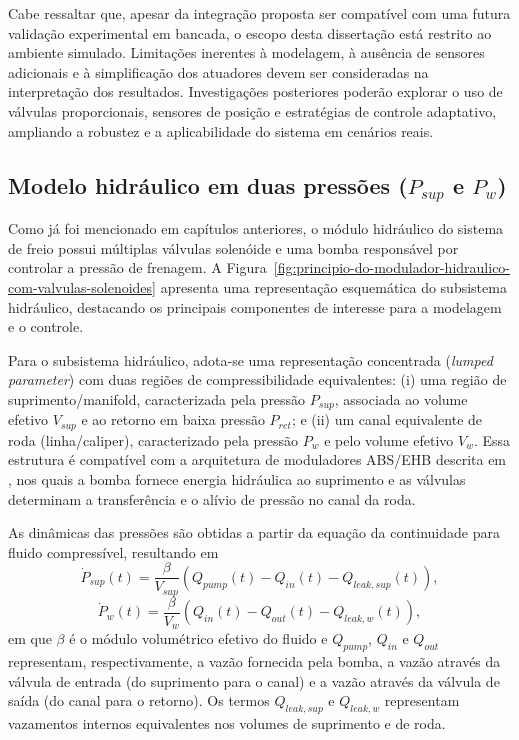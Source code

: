 Cabe ressaltar que, apesar da integração proposta ser compatível com uma futura validação experimental em bancada, o escopo desta dissertação está restrito ao ambiente simulado. Limitações inerentes à modelagem, à ausência de sensores adicionais e à simplificação dos atuadores devem ser consideradas na interpretação dos resultados. Investigações posteriores poderão explorar o uso de válvulas proporcionais, sensores de posição e estratégias de controle adaptativo, ampliando a robustez e a aplicabilidade do sistema em cenários reais.

\subsection{Modelo hidráulico em duas pressões ($P_{sup}$ e $P_{w}$)}
\label{sec:controle-modelo-hidraulico-2p}

Como já foi mencionado em capítulos anteriores, o módulo hidráulico do sistema de freio possui múltiplas válvulas solenóide e uma bomba responsável por controlar a pressão de frenagem. A Figura~\ref{fig:principio-do-modulador-hidraulico-com-valvulas-solenoides} apresenta uma representação esquemática do subsistema hidráulico, destacando os principais componentes de interesse para a modelagem e o controle.

Para o subsistema hidráulico, adota-se uma representação concentrada (\textit{lumped parameter}) com duas regiões de compressibilidade equivalentes: (i) uma região de suprimento/manifold, caracterizada pela pressão $P_{sup}$, associada ao volume efetivo $V_{sup}$ e ao retorno em baixa pressão $P_{ret}$; e (ii) um canal equivalente de roda (linha/caliper), caracterizado pela pressão $P_{w}$ e pelo volume efetivo $V_{w}$. Essa estrutura é compatível com a arquitetura de moduladores ABS/EHB descrita em , nos quais a bomba fornece energia hidráulica ao suprimento e as válvulas determinam a transferência e o alívio de pressão no canal da roda.

As dinâmicas das pressões são obtidas a partir da equação da continuidade para fluido compressível, resultando em
\begin{equation}
    \dot{P}_{sup}(t) = \frac{\beta}{V_{sup}}\left(Q_{pump}(t) - Q_{in}(t) - Q_{leak,sup}(t)\right),
    \label{eq:psup_dot}
\end{equation}
\begin{equation}
    \dot{P}_{w}(t) = \frac{\beta}{V_{w}}\left(Q_{in}(t) - Q_{out}(t) - Q_{leak,w}(t)\right),
    \label{eq:pw_dot}
\end{equation}
em que $\beta$ é o módulo volumétrico efetivo do fluido e $Q_{pump}$, $Q_{in}$ e $Q_{out}$ representam, respectivamente, a vazão fornecida pela bomba, a vazão através da válvula de entrada (do suprimento para o canal) e a vazão através da válvula de saída (do canal para o retorno). Os termos $Q_{leak,sup}$ e $Q_{leak,w}$ representam vazamentos internos equivalentes nos volumes de suprimento e de roda.

